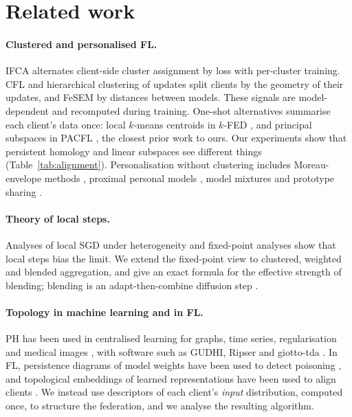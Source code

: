 \section{Related work}
\label{sec:related}

\paragraph{Clustered and personalised FL.}
IFCA \citep{ghosh2020efficient} alternates client-side cluster assignment by loss with
per-cluster training. CFL \citep{sattler2020clustered} and hierarchical clustering of updates
\citep{briggs2020federated} split clients by the geometry of their updates, and FeSEM
\citep{long2023multi} by distances between models. These signals are model-dependent and
recomputed during training. One-shot alternatives summarise each client's data once: local
$k$-means centroids in $k$-FED \citep{dennis2021heterogeneity}, and principal subspaces in
PACFL \citep{vahidian2023efficient}, the closest prior work to ours. Our experiments show
that persistent homology and linear subspaces see different things (Table~\ref{tab:alignment}).
Personalisation without clustering includes Moreau-envelope methods
\citep{t2020personalized}, proximal personal models \citep{li2021ditto}, model mixtures
\citep{deng2020adaptive,hanzely2020federated} and prototype sharing \citep{tan2022fedproto}.

\paragraph{Theory of local steps.}
Analyses of local SGD under heterogeneity
\citep{stich2019local,khaled2020tighter,koloskova2020unified,woodworth2020minibatch,karimireddy2020scaffold}
and fixed-point analyses \citep{malinovsky2020local,charles2021convergence,pathak2020fedsplit}
show that local steps bias the limit. We extend the fixed-point view to clustered, weighted
and blended aggregation, and give an exact formula for the effective strength of blending;
blending is an adapt-then-combine diffusion step \citep{sayed2014adaptation}.

\paragraph{Topology in machine learning and in FL.}
PH has been used in centralised learning for graphs, time series, regularisation and medical
images
\citep{hofer2017deep,umeda2017time,chen2019topological,clough2020topological,abaach2023geotop,gouiaa2024taelcore},
with software such as GUDHI, Ripser and giotto-tda \citep{gudhi,ripser,tauzin2021giotto}.
In FL, persistence diagrams of model weights have been used to detect poisoning
\citep{ma2024federated,alipourjeddi2025topology}, and topological embeddings of learned
representations have been used to align clients \citep{hu2025fedtopo}. We instead use
descriptors of each client's \emph{input} distribution, computed once, to structure the
federation, and we analyse the resulting algorithm.

